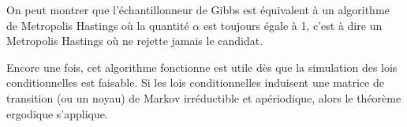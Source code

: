 On peut montrer que l'échantillonneur de Gibbs est équivalent à un algorithme de Metropolis Hastings où la quantité $\alpha$ est toujours égale à 1, c'est à dire un Metropolis Hastings où ne rejette jamais le candidat.

Encore une fois, cet algorithme fonctionne est utile dès que la simulation des lois conditionnelles est faisable. Si les lois conditionnelles induisent une matrice de transition (ou un noyau) de Markov irréductible et apériodique, alors le théorème ergodique s'applique.



